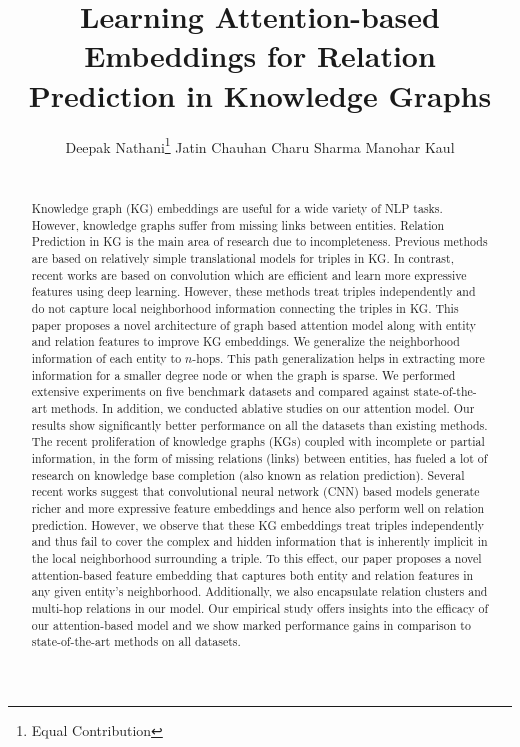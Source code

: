 \documentclass[11pt,a4paper]{article}
\title{Learning Attention-based Embeddings for Relation Prediction in Knowledge Graphs}
\author{Deepak Nathani\thanks{\hspace{0.01in} Equal Contribution} \qquad
  Jatin Chauhan\footnotemark[1]  \qquad
  Charu Sharma\footnotemark[1]  \qquad
  Manohar Kaul \\
  \affaddr{Department of Computer Science and Engineering, IIT Hyderbad} \\
 \email{\{deepakn1019,chauhanjatin100,charusharma1991\}@gmail.com, mkaul@iith.ac.in}
}
\date{}
\begin{document}
\maketitle
\begin{abstract}
Knowledge graph (KG) embeddings are useful for a wide variety of NLP tasks. However, knowledge graphs suffer from missing links between entities. Relation Prediction in KG is the main area of research due to incompleteness. Previous methods are based on relatively simple translational models for triples in KG. In contrast, recent works are based on 
convolution which are efficient and learn more expressive features using deep learning. However, these methods treat triples independently and do not capture local neighborhood information connecting the triples in KG.
This paper proposes a novel architecture of graph based attention model along with entity and relation features to improve KG embeddings. We generalize the neighborhood information of each entity to $n$-hops. This path generalization helps in extracting more information 
for a smaller degree node or when the graph is sparse. We performed extensive experiments on five benchmark datasets and compared against state-of-the-art methods.  In addition, we conducted ablative studies on our attention model. Our results show significantly better performance on all the datasets than existing methods.
\fi
The recent proliferation of knowledge graphs (KGs) coupled with incomplete or partial information, in the form of missing relations (links) between entities, has fueled a lot of research on knowledge base completion (also known as relation prediction). Several recent works suggest that convolutional neural network (CNN) based models generate richer and more expressive feature embeddings and hence also perform well on relation prediction. 
However, we observe that these KG embeddings treat triples independently and thus fail to cover the complex and hidden information that is inherently implicit in the local neighborhood surrounding a triple. 
To this effect, our paper proposes a novel attention-based feature embedding that captures both entity and relation features in any given entity's neighborhood. Additionally, we also encapsulate relation clusters and multi-hop relations 
in our model. Our empirical study offers insights into the efficacy of our attention-based model and we show marked performance gains in comparison to state-of-the-art methods on all datasets.

\end{abstract}
\end{document}
